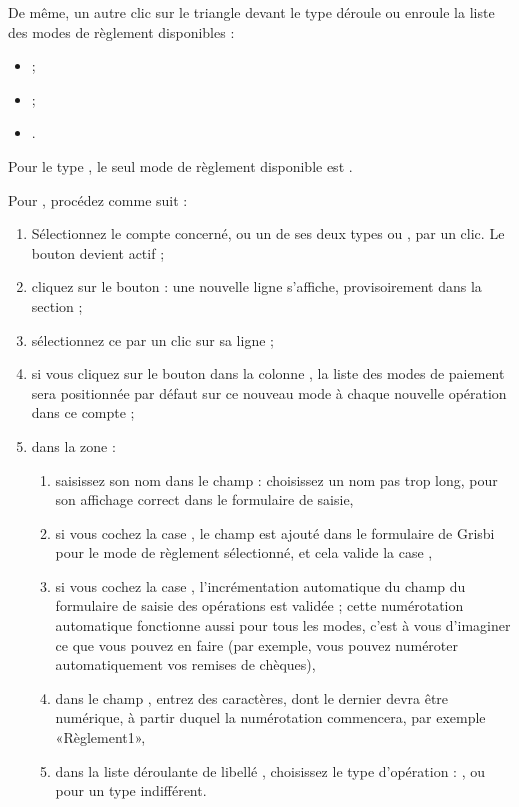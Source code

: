 De même, un autre clic sur le triangle devant le type  déroule ou enroule la liste des modes de règlement disponibles :

\begin{itemize}
	\item {} ;
	\item {} ;
	\item {}.
\end{itemize}

Pour le type , le seul mode de règlement disponible est .

\ifIllustration
\else
\fi

Pour , procédez comme suit :

\begin{enumerate}
	\item Sélectionnez le compte concerné, ou un de ses deux types  ou  , par un clic. Le bouton  devient actif ;
	\item cliquez sur le bouton  : une nouvelle ligne  s'affiche, provisoirement dans la section  ;
	\item sélectionnez ce  par un clic sur sa ligne ;
	\item si vous cliquez sur le bouton dans la colonne  , la liste des modes de paiement sera positionnée par défaut sur ce nouveau mode à chaque nouvelle opération dans ce compte ;
	\item dans la zone  :
		\begin{enumerate}
			\item saisissez son nom dans le champ  : choisissez un nom pas trop long, pour son affichage correct dans le formulaire de saisie,
			\item si vous cochez la case , le champ  est ajouté dans le formulaire de Grisbi pour le mode de règlement sélectionné, et cela valide la case ,
			\item si vous cochez la case , l'incrémentation automatique du champ  du formulaire de saisie des opérations est validée ; cette numérotation automatique fonctionne aussi pour tous les modes, c'est à vous d'imaginer ce que vous pouvez en faire (par exemple, vous pouvez numéroter automatiquement vos remises de chèques),
			\item dans le champ , entrez des caractères, dont le dernier devra être numérique, à partir duquel la numérotation commencera, par exemple «Règlement1»,
			\item dans la liste déroulante de libellé  , choisissez le type d'opération : ,  ou  pour un type indifférent.
		\end{enumerate}
\end{enumerate}

